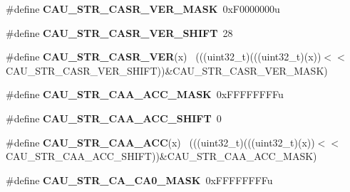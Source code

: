 \begin{DoxyCompactItemize}
\item 
\hypertarget{group___c_a_u___register___masks_ga5447564cf9ebe8e0ed52d5367304d0cd}{}\#define {\bfseries C\+A\+U\+\_\+\+S\+T\+R\+\_\+\+C\+A\+S\+R\+\_\+\+V\+E\+R\+\_\+\+M\+A\+S\+K}~0x\+F0000000u\label{group___c_a_u___register___masks_ga5447564cf9ebe8e0ed52d5367304d0cd}

\item 
\hypertarget{group___c_a_u___register___masks_ga8103f4482a52d4ea2c47a26161596b66}{}\#define {\bfseries C\+A\+U\+\_\+\+S\+T\+R\+\_\+\+C\+A\+S\+R\+\_\+\+V\+E\+R\+\_\+\+S\+H\+I\+F\+T}~28\label{group___c_a_u___register___masks_ga8103f4482a52d4ea2c47a26161596b66}

\item 
\hypertarget{group___c_a_u___register___masks_ga07bc7a7152b7df246c8db84f1c4ff6f8}{}\#define {\bfseries C\+A\+U\+\_\+\+S\+T\+R\+\_\+\+C\+A\+S\+R\+\_\+\+V\+E\+R}(x)                                        ~(((uint32\+\_\+t)(((uint32\+\_\+t)(x))$<$$<$C\+A\+U\+\_\+\+S\+T\+R\+\_\+\+C\+A\+S\+R\+\_\+\+V\+E\+R\+\_\+\+S\+H\+I\+F\+T))\&C\+A\+U\+\_\+\+S\+T\+R\+\_\+\+C\+A\+S\+R\+\_\+\+V\+E\+R\+\_\+\+M\+A\+S\+K)\label{group___c_a_u___register___masks_ga07bc7a7152b7df246c8db84f1c4ff6f8}

\item 
\hypertarget{group___c_a_u___register___masks_gafdeac08a5e2a414586e6cfb318a3beca}{}\#define {\bfseries C\+A\+U\+\_\+\+S\+T\+R\+\_\+\+C\+A\+A\+\_\+\+A\+C\+C\+\_\+\+M\+A\+S\+K}~0x\+F\+F\+F\+F\+F\+F\+F\+Fu\label{group___c_a_u___register___masks_gafdeac08a5e2a414586e6cfb318a3beca}

\item 
\hypertarget{group___c_a_u___register___masks_gaad9cefe85fb570468c92429a601f3c30}{}\#define {\bfseries C\+A\+U\+\_\+\+S\+T\+R\+\_\+\+C\+A\+A\+\_\+\+A\+C\+C\+\_\+\+S\+H\+I\+F\+T}~0\label{group___c_a_u___register___masks_gaad9cefe85fb570468c92429a601f3c30}

\item 
\hypertarget{group___c_a_u___register___masks_ga7ec54b6eec3fd12030547c2a47d98dd8}{}\#define {\bfseries C\+A\+U\+\_\+\+S\+T\+R\+\_\+\+C\+A\+A\+\_\+\+A\+C\+C}(x)                                          ~(((uint32\+\_\+t)(((uint32\+\_\+t)(x))$<$$<$C\+A\+U\+\_\+\+S\+T\+R\+\_\+\+C\+A\+A\+\_\+\+A\+C\+C\+\_\+\+S\+H\+I\+F\+T))\&C\+A\+U\+\_\+\+S\+T\+R\+\_\+\+C\+A\+A\+\_\+\+A\+C\+C\+\_\+\+M\+A\+S\+K)\label{group___c_a_u___register___masks_ga7ec54b6eec3fd12030547c2a47d98dd8}

\item 
\hypertarget{group___c_a_u___register___masks_ga7490044c911fb60ad77baacec88b73a0}{}\#define {\bfseries C\+A\+U\+\_\+\+S\+T\+R\+\_\+\+C\+A\+\_\+\+C\+A0\+\_\+\+M\+A\+S\+K}~0x\+F\+F\+F\+F\+F\+F\+F\+Fu\label{group___c_a_u___register___masks_ga7490044c911fb60ad77baacec88b73a0}


\end{DoxyCompactItemize}
